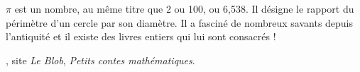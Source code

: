\vspace*{-8mm}

\vspace*{-5mm}
\begin{debat} 
    $\pi$ est un nombre, au même titre que 2 ou 100, ou 6,538. Il désigne le rapport du périmètre d'un cercle par son diamètre. Il a fasciné de nombreux savants depuis l'antiquité et il existe des livres entiers qui lui sont consacrés !
    \begin{center}
        \spiraleArchimedePi[2]
    \end{center}
    \begin{cadre}[B2][F4]
          , site {\it Le Blob}, {\it Petits contes mathématiques}.
          
          \smallskip
    \end{cadre}
 \end{debat}